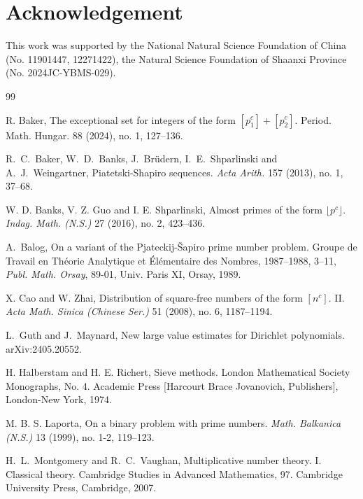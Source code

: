 \documentclass[12pt, reqno, twoside, letterpaper]{amsart}
\numberwithin{equation}{section}
\theoremstyle{customthm}
\theoremstyle{customrem}
\begin{document}
\section*{Acknowledgement}
This work was supported by the National Natural Science Foundation of China (No. 11901447, 12271422), the Natural Science Foundation of Shaanxi Province (No. 2024JC-YBMS-029). 


\begin{thebibliography}{99}


R. Baker, 
The exceptional set for integers of the form $[p_1^c]+[p_2^c]$.
Period. Math. Hungar. 88 (2024), no. 1, 127--136.
	
R.~C.~Baker, W.~D.~Banks, J.~Br\"{u}dern, I.~E.~Shparlinski and A.~J.~Weingartner,
Piatetski-Shapiro sequences.
\emph{Acta Arith.} 157 (2013), no. 1, 37--68.

W. D. Banks, V. Z. Guo and I. E. Shparlinski, 
Almost primes of the form $\lfloor p^c \rfloor$. 
\emph{Indag. Math. (N.S.)} 27 (2016), no. 2, 423--436. 


A.~Balog, 
On a variant of the Pjateckij-Šapiro prime number problem. Groupe de Travail en Théorie Analytique et Élémentaire des Nombres, 1987--1988, 3--11, \emph{Publ. Math. Orsay}, 89-01, Univ. Paris XI, Orsay, 1989.

X. Cao and W. Zhai,
Distribution of square-free numbers of the form $[n^c]$. II.
\emph{Acta Math. Sinica (Chinese Ser.)} 51 (2008), no. 6, 1187--1194.

 
L.~Guth and J.~Maynard,	
New large value estimates for Dirichlet polynomials. arXiv:2405.20552. 

H. Halberstam and H. E. Richert, 
Sieve methods.
London Mathematical Society Monographs, No. 4. Academic Press [Harcourt Brace Jovanovich, Publishers], London-New York, 1974. 


M. B. S. Laporta,
On a binary problem with prime numbers.
\emph{Math. Balkanica (N.S.)} 13 (1999), no. 1-2, 119--123.
 
H.~L.~Montgomery and R.~C.~Vaughan,  
Multiplicative number theory. I. Classical theory. Cambridge Studies in Advanced Mathematics, 97. Cambridge University Press, Cambridge, 2007. 
  


\end{thebibliography}
\end{document}
